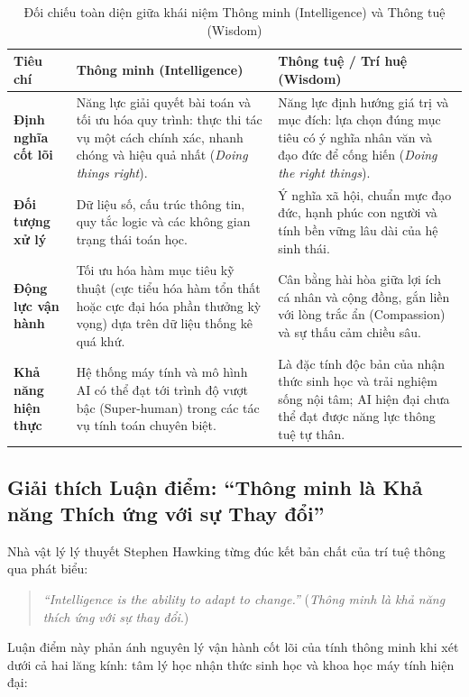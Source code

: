 \begin{table}[H]
\centering
\small
\caption{Đối chiếu toàn diện giữa khái niệm Thông minh (Intelligence) và Thông tuệ (Wisdom)}
\label{tab:comp_intelligence_wisdom}
\renewcommand{\arraystretch}{1.3}
\begin{tabularx}{\textwidth}{|p{3.0cm}|X|X|}
\hline
\textbf{Tiêu chí} & \textbf{Thông minh (Intelligence)} & \textbf{Thông tuệ / Trí huệ (Wisdom)} \\
\hline
\textbf{Định nghĩa cốt lõi} & Năng lực giải quyết bài toán và tối ưu hóa quy trình: thực thi tác vụ một cách chính xác, nhanh chóng và hiệu quả nhất (\textit{Doing things right}). & Năng lực định hướng giá trị và mục đích: lựa chọn đúng mục tiêu có ý nghĩa nhân văn và đạo đức để cống hiến (\textit{Doing the right things}). \\
\hline
\textbf{Đối tượng xử lý} & Dữ liệu số, cấu trúc thông tin, quy tắc logic và các không gian trạng thái toán học. & Ý nghĩa xã hội, chuẩn mực đạo đức, hạnh phúc con người và tính bền vững lâu dài của hệ sinh thái. \\
\hline
\textbf{Động lực vận hành} & Tối ưu hóa hàm mục tiêu kỹ thuật (cực tiểu hóa hàm tổn thất hoặc cực đại hóa phần thưởng kỳ vọng) dựa trên dữ liệu thống kê quá khứ. & Cân bằng hài hòa giữa lợi ích cá nhân và cộng đồng, gắn liền với lòng trắc ẩn (Compassion) và sự thấu cảm chiều sâu. \\
\hline
\textbf{Khả năng hiện thực} & Hệ thống máy tính và mô hình AI có thể đạt tới trình độ vượt bậc (Super-human) trong các tác vụ tính toán chuyên biệt. & Là đặc tính độc bản của nhận thức sinh học và trải nghiệm sống nội tâm; AI hiện đại chưa thể đạt được năng lực thông tuệ tự thân. \\
\hline
\end{tabularx}
\end{table}

\subsection{Giải thích Luận điểm: ``Thông minh là Khả năng Thích ứng với sự Thay đổi''}

Nhà vật lý lý thuyết Stephen Hawking từng đúc kết bản chất của trí tuệ thông qua phát biểu:
\begin{quote}
\textit{``Intelligence is the ability to adapt to change.''} (\textit{Thông minh là khả năng thích ứng với sự thay đổi}.)
\end{quote}

Luận điểm này phản ánh nguyên lý vận hành cốt lõi của tính thông minh khi xét dưới cả hai lăng kính: tâm lý học nhận thức sinh học và khoa học máy tính hiện đại:

